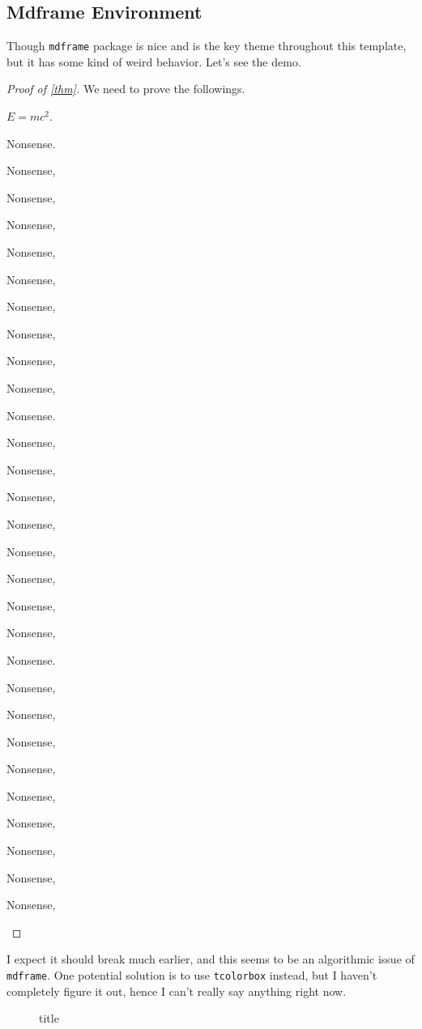\subsection{Mdframe Environment}
Though \texttt{mdframe} package is nice and is the key theme throughout this template, but it has some kind of weird behavior. Let's see the demo.
\begin{proof}[Proof of \autoref{thm}]
	We need to prove the followings.
	\begin{claim}
		\(E = mc^{2} \).
	\end{claim}
	\begin{explanation}

		Nonsense.

		Nonsense,

		Nonsense,

		Nonsense,

		Nonsense,

		Nonsense,

		Nonsense,

		Nonsense,

		Nonsense,

		Nonsense,

		Nonsense.

		Nonsense,

		Nonsense,

		Nonsense,

		Nonsense,

		Nonsense,

		Nonsense,

		Nonsense,

		Nonsense,

		Nonsense.

		Nonsense,

		Nonsense,

		Nonsense,

		Nonsense,

		Nonsense,

		Nonsense,

		Nonsense,

		Nonsense,

		Nonsense,
	\end{explanation}

\end{proof}

I expect it should break much earlier, and this seems to be an algorithmic issue of \texttt{mdframe}. One potential solution is to use \texttt{tcolorbox} instead,
but I haven't completely figure it out, hence I can't really say anything right now.

\begin{figure}[H]
	\centering
	\caption{title}
	\label{fig:testing}
\end{figure}